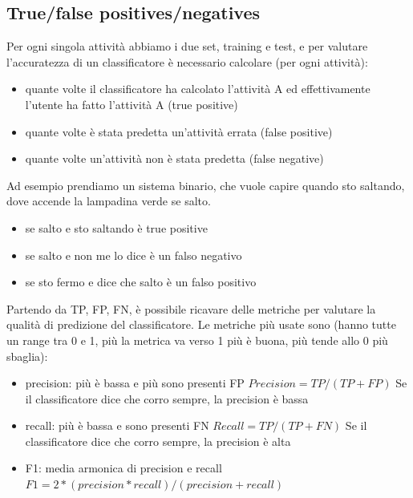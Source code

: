 \subsection{True/false positives/negatives}
Per ogni singola attività abbiamo i due set, training e test, e 
per valutare l'accuratezza di un classificatore è necessario calcolare (per ogni attività):
\begin{itemize}
    \item quante volte il classificatore ha calcolato l'attività A ed effettivamente l'utente ha fatto l'attività A (true positive)
    \item quante volte è stata predetta un'attività errata (false positive) 
    \item quante volte un'attività non è stata predetta (false negative)
\end{itemize}
Ad esempio prendiamo un sistema binario, che vuole capire quando sto saltando, dove accende la lampadina verde se salto. 
\begin{itemize}
    \item se salto e sto saltando è true positive
    \item se salto e non me lo dice è un falso negativo
    \item se sto fermo e dice che salto è un falso positivo
\end{itemize}

Partendo da TP, FP, FN, è possibile ricavare delle metriche per valutare la qualità di predizione del classificatore.
Le metriche più usate sono (hanno tutte un range tra 0 e 1, più la metrica va verso 1 più è buona, più tende allo 0 più sbaglia): \begin{itemize}
    \item precision: più è bassa e più sono presenti FP
    \begin{math}
        Precision = TP/(TP+FP)
    \end{math}
    Se il classificatore dice che corro sempre, la precision è bassa
    \item recall: più è bassa e sono presenti FN
    \begin{math}
        Recall = TP/(TP+FN)
    \end{math}
    Se il classificatore dice che corro sempre, la precision è alta
    \item F1: media armonica di precision e recall
    \begin{math}
        F1 = 2*(precision*recall)/(precision+recall)
    \end{math}
\end{itemize} 

